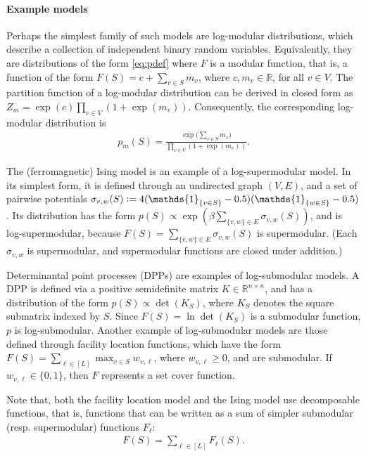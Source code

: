 

\paragraph{Example models}
Perhaps the simplest family of such models are log-modular distributions, which describe a collection of independent binary random variables.
Equivalently, they are distributions of the form \eqref{eq:pdef} where $F$ is a modular function, that is, a function of the form $F(S) = c + \sum_{v \in S}m_v$, where $c, m_v \in \mathbb{R}$, for all $v \in V$.
The partition function of a log-modular distribution can be derived in closed form as $Z_m = \exp(c) \prod_{v \in V} \left( 1 + \exp(m_v) \right)$.
Consequently, the corresponding log-modular distribution is
\begin{align*}
  p_m(S) = \frac{\exp\big( \sum_{v \in S} m_v \big)}{\prod_{v \in V} \left( 1 + \exp(m_v) \right)}.
\end{align*}

The (ferromagnetic) Ising model is an example of a log-supermodular model.
In its simplest form, it is defined through an undirected graph $(V, E)$, and a set of pairwise potentials $\sigma_{v,w}(S) \defeq 4(\mathds{1}_{\{v \in S\}}-0.5)(\mathds{1}_{\{w \in S\}}-0.5)$.
Its distribution has the form $p(S) \propto \exp(\beta\sum_{\{v,w\} \in E} \sigma_{v,w}(S))$, and is log-supermodular, because $F(S) = \sum_{\{v,w\} \in E} \sigma_{v,w}(S)$ is supermodular. (Each $\sigma_{v,w}$ is supermodular, and supermodular functions are closed under addition.)

Determinantal point processes (DPPs) are examples of log-submodular models.
A DPP is defined via a positive semidefinite matrix $K \in \mathbb{R}^{n \times n}$, and has a distribution of the form $p(S) \propto \det(K_S)$, where $K_S$ denotes the square submatrix indexed by $S$.
Since $F(S) = \ln \det(K_S)$ is a submodular function, $p$ is log-submodular.
Another example of log-submodular models are those defined through facility location functions, which have the form $F(S) = \sum_{\ell \in [L]} \max_{v \in S}w_{v,\ell}$, where $w_{v,\ell} \geq 0$, and are submodular.
If $w_{v,\ell} \in \{0, 1\}$, then $F$ represents a set cover function.

Note that, both the facility location model and the Ising model use decomposable functions, that is, functions that can be written as a sum of simpler submodular (resp. supermodular) functions $F_{\ell}$:
\begin{align} \label{eq:fdec}
F(S) = \sum_{\ell \in [L]} F_{\ell}(S).
\end{align}

